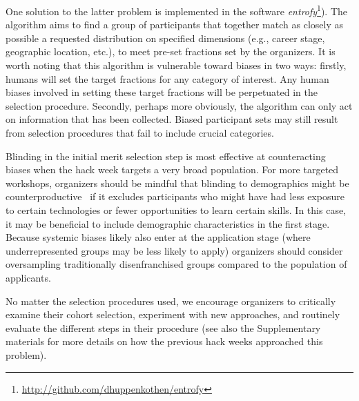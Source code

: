 One solution to the latter problem is implemented in the software \textit{entrofy}\footnote{\url{http://github.com/dhuppenkothen/entrofy}}). 
The algorithm aims to find a group of participants that together match as closely as possible a requested distribution on specified dimensions (e.g., career stage, geographic location, etc.), to meet pre-set fractions set by the organizers.
It is worth noting that this algorithm is vulnerable toward biases in two ways: firstly, humans will set the target fractions for any category of interest.  
Any human biases involved in setting these target fractions will be perpetuated in the selection procedure. 
Secondly, perhaps more obviously, the algorithm can only act on information that has been collected.
Biased participant sets may still result from selection procedures that fail to include crucial categories. %

Blinding in the initial merit selection step is most effective at counteracting biases when the hack week targets a very broad population. 
For more targeted workshops, organizers should be mindful that blinding to demographics might be counterproductive~\cite{behaghel2015unintended} if it excludes participants who might have had less exposure to certain technologies or fewer opportunities to learn certain skills. 
In this case, it may be beneficial to include demographic characteristics in the first stage. 
Because systemic biases likely also enter at the application stage (where underrepresented groups may be less likely to apply) organizers should consider oversampling traditionally disenfranchised groups compared to the population of applicants. 

No matter the selection procedures used, we encourage organizers to critically examine their cohort selection, experiment with new approaches, and routinely evaluate the different steps in their procedure%
(see also the Supplementary materials for more details on how the previous hack weeks approached this problem). 

